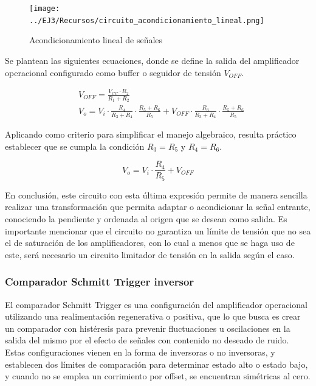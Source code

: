 \begin{figure}[H]
    \centering
    \texttt{[image: ../EJ3/Recursos/circuito\_acondicionamiento\_lineal.png]}
    \caption{Acondicionamiento lineal de se\~nales}
    \label{fig:circuito_acondicionamiento_lineal}
\end{figure}

Se plantean las siguientes ecuaciones, donde se define la salida del amplificador operacional configurado como buffer o seguidor de tensi\'on $V_{OFF}$.

\begin{align*}
    & V_{OFF} = \frac{V_{CC} \cdot R_2}{R_1 + R_2} \\
    & V_o = V_i \cdot \frac{R_4}{R_3 + R_4} \cdot \frac{R_5 + R_6}{R_5}
    + V_{OFF} \cdot \frac{R_3}{R_3 + R_4} \cdot \frac{R_5 + R_6}{R_5}
\end{align*}

Aplicando como criterio para simplificar el manejo algebraico, resulta pr\'actico establecer que se cumpla la condici\'on
$R_3 = R_5$ y $R_4 = R_6$.

\begin{equation}
    V_o = V_i \cdot \frac{R_4}{R_5} + V_{OFF}
\end{equation}

En conclusi\'on, este circuito con esta \'ultima expresi\'on permite de manera sencilla realizar una transformaci\'on que permita adaptar o acondicionar
la se\~nal entrante, conociendo la pendiente y ordenada al origen que se desean como salida. Es importante mencionar que el circuito no garantiza un l\'imite de tensi\'on 
que no sea el de saturaci\'on de los amplificadores, con lo cual a menos que se haga uso de este, ser\'a necesario un circuito limitador de tensi\'on en la salida seg\'un el caso.

\subsubsection{Comparador Schmitt Trigger inversor}
El comparador Schmitt Trigger es una configuraci\'on del amplificador operacional utilizando una realimentaci\'on regenerativa o positiva,
que lo que busca es crear un comparador con hist\'eresis para prevenir fluctuaciones u oscilaciones en la salida del mismo por el efecto de se\~nales
con contenido no deseado de ruido. Estas configuraciones vienen en la forma de inversoras o no inversoras, y establecen dos l\'imites de comparaci\'on
para determinar estado alto o estado bajo, y cuando no se emplea un corrimiento por offset, se encuentran sim\'etricas al cero.

